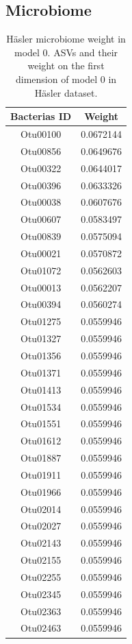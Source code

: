 \documentclass[
  12pt,
  a4paper,
  twoside,
  openright]{book}
\begin{document}
\hypertarget{microbiome-3}{%
\subsection{Microbiome}\label{microbiome-3}}

\begin{longtable}[t]{cc}
\caption[Häsler microbiome weight in model 0]{\label{tab:hasler-microbiome}Häsler microbiome weight in model 0. ASVs and their weight on the first dimension of model 0 in Häsler dataset.}\\
\toprule
Bacterias ID & Weight\\
\midrule
Otu00100 & 0.0672144\\
Otu00856 & 0.0649676\\
Otu00322 & 0.0644017\\
Otu00396 & 0.0633326\\
Otu00038 & 0.0607676\\
\addlinespace
Otu00607 & 0.0583497\\
Otu00839 & 0.0575094\\
Otu00021 & 0.0570872\\
Otu01072 & 0.0562603\\
Otu00013 & 0.0562207\\
\addlinespace
Otu00394 & 0.0560274\\
Otu01275 & 0.0559946\\
Otu01327 & 0.0559946\\
Otu01356 & 0.0559946\\
Otu01371 & 0.0559946\\
\addlinespace
Otu01413 & 0.0559946\\
Otu01534 & 0.0559946\\
Otu01551 & 0.0559946\\
Otu01612 & 0.0559946\\
Otu01887 & 0.0559946\\
\addlinespace
Otu01911 & 0.0559946\\
Otu01966 & 0.0559946\\
Otu02014 & 0.0559946\\
Otu02027 & 0.0559946\\
Otu02143 & 0.0559946\\
\addlinespace
Otu02155 & 0.0559946\\
Otu02255 & 0.0559946\\
Otu02345 & 0.0559946\\
Otu02363 & 0.0559946\\
Otu02463 & 0.0559946\\
\bottomrule
\end{longtable}
\end{document}
